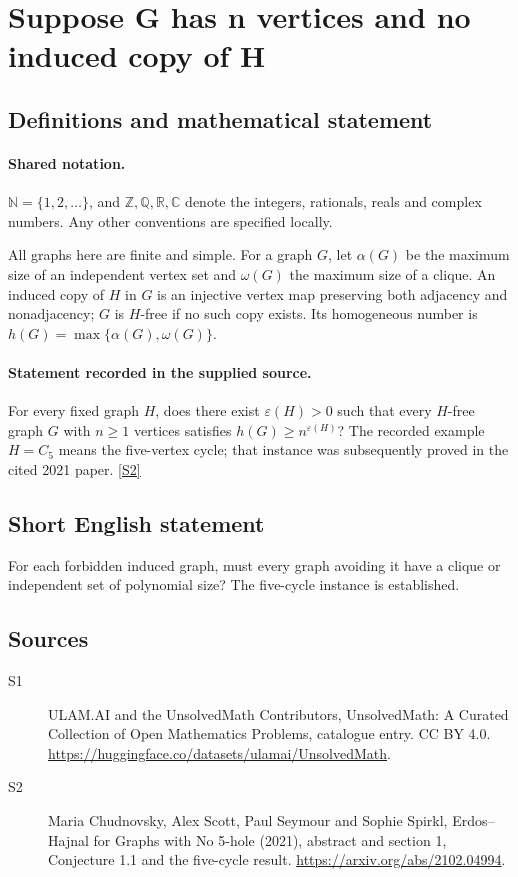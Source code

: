 \documentclass[11pt]{article}
\newcommand{\sref}[2]{\hyperlink{source:#1:#2}{[S#2]}}
\begin{document}
\section{Suppose G has n vertices and no induced copy of H}\label{statement}

\subsection{Definitions and mathematical statement}

\paragraph{Shared notation.}$\mathbb N=\{1,2,\ldots\}$, and $\mathbb Z,\mathbb Q,\mathbb R,\mathbb C$ denote the integers, rationals, reals and complex numbers. Any other conventions are specified locally.


All graphs here are finite and simple. For a graph $G$, let $\alpha(G)$ be the maximum size of an independent vertex set and $\omega(G)$ the maximum size of a clique. An induced copy of $H$ in $G$ is an injective vertex map preserving both adjacency and nonadjacency; $G$ is $H$-free if no such copy exists. Its homogeneous number is $h(G)=\max\{\alpha(G),\omega(G)\}$.
\paragraph{Statement recorded in the supplied source.}
For every fixed graph $H$, does there exist $\varepsilon(H)>0$ such that every $H$-free graph $G$ with $n\geq1$ vertices satisfies $h(G)\geq n^{\varepsilon(H)}$? The recorded example $H=C_5$ means the five-vertex cycle; that instance was subsequently proved in the cited 2021 paper. \sref{statement}{2}
\subsection{Short English statement}
For each forbidden induced graph, must every graph avoiding it have a clique or independent set of polynomial size? The five-cycle instance is established.
\subsection{Sources}
\begin{description}
\item[\hypertarget{source:statement:1}{S1}] ULAM.AI and the UnsolvedMath Contributors, UnsolvedMath: A Curated Collection of Open Mathematics Problems, catalogue entry. CC BY 4.0. \url{https://huggingface.co/datasets/ulamai/UnsolvedMath}.
\item[\hypertarget{source:statement:2}{S2}] Maria Chudnovsky, Alex Scott, Paul Seymour and Sophie Spirkl, Erdos--Hajnal for Graphs with No 5-hole (2021), abstract and section 1, Conjecture 1.1 and the five-cycle result. \url{https://arxiv.org/abs/2102.04994}.
\end{description}
\label{end:statement}
\end{document}
